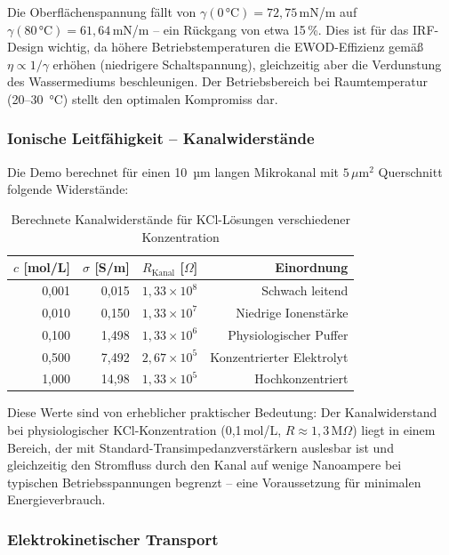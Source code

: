 ﻿\documentclass[a4paper,12pt]{scrreprt}
\theoremstyle{definition}
\begin{document}
Die Oberflächenspannung fällt von $\gamma(0\, °\text{C}) = 72{,}75$\,mN/m auf
$\gamma(80\, °\text{C}) = 61{,}64$\,mN/m -- ein Rückgang von etwa 15\,\%.
Dies ist für das IRF-Design wichtig, da höhere Betriebstemperaturen die
EWOD-Effizienz gemäß $\eta \propto 1/\gamma$ erhöhen (niedrigere Schaltspannung),
gleichzeitig aber die Verdunstung des Wassermediums beschleunigen. Der
Betriebsbereich bei Raumtemperatur (20--30\, °C) stellt den optimalen
Kompromiss dar.

\subsubsection{Ionische Leitfähigkeit -- Kanalwiderstände}

Die Demo berechnet für einen 10\, µm langen Mikrokanal mit $5\,\mu\text{m}^2$
Querschnitt folgende Widerstände:

\begin{table}[H]
	\centering
	\caption{Berechnete Kanalwiderstände für KCl-Lösungen verschiedener Konzentration}
	\label{tab:kanalwiderstand}
	\begin{tabular}{rrrr}
		\toprule
		$c$ [mol/L] & $\sigma$ [S/m] & $R_\text{Kanal}$ [$\Omega$] & Einordnung \\
		\midrule
		0,001 & 0,015 & $1{,}33 \times 10^{8}$ & Schwach leitend \\
		0,010 & 0,150 & $1{,}33 \times 10^{7}$ & Niedrige Ionenstärke \\
		0,100 & 1,498 & $1{,}33 \times 10^{6}$ & Physiologischer Puffer \\
		0,500 & 7,492 & $2{,}67 \times 10^{5}$ & Konzentrierter Elektrolyt \\
		1,000 & 14,98 & $1{,}33 \times 10^{5}$ & Hochkonzentriert \\
		\bottomrule
	\end{tabular}
\end{table}

Diese Werte sind von erheblicher praktischer Bedeutung: Der Kanalwiderstand
bei physiologischer KCl-Konzentration (0,1\,mol/L, $R \approx 1{,}3$\,M$\Omega$)
liegt in einem Bereich, der mit Standard-Transimpedanzverstärkern auslesbar
ist und gleichzeitig den Stromfluss durch den Kanal auf wenige Nanoampere
bei typischen Betriebsspannungen begrenzt -- eine Voraussetzung für minimalen
Energieverbrauch.

\subsubsection{Elektrokinetischer Transport}
\end{document}
